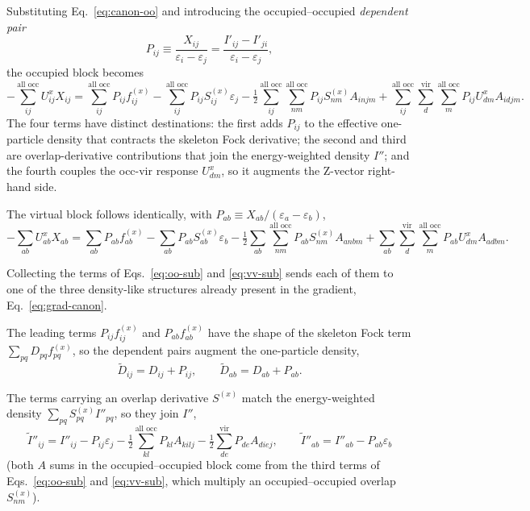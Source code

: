 \documentclass[12pt]{article}
\newcommand{\vir}{\text{vir}}
\newcommand{\alloc}{\text{all occ}}   %
\begin{document}
\noindent
Substituting Eq.~\eqref{eq:canon-oo} and introducing the occupied--occupied
{\em dependent pair}
\begin{equation}
P_{ij} \equiv \frac{X_{ij}}{\varepsilon_i-\varepsilon_j}
= \frac{I'_{ij}-I'_{ji}}{\varepsilon_i-\varepsilon_j},
\label{eq:Poo}
\end{equation}
the occupied block becomes
\begin{equation}
-\sum_{ij}^{\alloc}U^x_{ij}X_{ij}
= \sum_{ij}^{\alloc}P_{ij}f^{(x)}_{ij}
- \sum_{ij}^{\alloc}P_{ij}S^{(x)}_{ij}\varepsilon_j
- \tfrac12\sum_{ij}^{\alloc}\sum_{nm}^{\alloc}P_{ij}S^{(x)}_{nm}A_{injm}
+ \sum_{ij}^{\alloc}\sum_{d}^{\vir}\sum_{m}^{\alloc}P_{ij}U^x_{dm}A_{idjm}.
\label{eq:oo-sub}
\end{equation}
The four terms have distinct
destinations: the first adds $P_{ij}$ to the effective
one-particle density that contracts the skeleton Fock derivative; the second and
third are overlap-derivative contributions that join the energy-weighted density
$I''$; and the fourth couples the occ-vir response $U^x_{dm}$, so it augments the
Z-vector right-hand side.

\noindent
The virtual block follows identically, with
$P_{ab}\equiv X_{ab}/(\varepsilon_a-\varepsilon_b)$,
\begin{equation}
-\sum_{ab}U^x_{ab}X_{ab}
= \sum_{ab}P_{ab}f^{(x)}_{ab}
- \sum_{ab}P_{ab}S^{(x)}_{ab}\varepsilon_b
- \tfrac12\sum_{ab}\sum_{nm}^{\alloc}P_{ab}S^{(x)}_{nm}A_{anbm}
+ \sum_{ab}\sum_{d}^{\vir}\sum_{m}^{\alloc}P_{ab}U^x_{dm}A_{adbm}.
\label{eq:vv-sub}
\end{equation}

Collecting the terms of Eqs.~\eqref{eq:oo-sub} and \eqref{eq:vv-sub} sends each
of them to one of the three density-like structures already present in the
gradient, Eq.~\eqref{eq:grad-canon}.

The leading terms $P_{ij}f^{(x)}_{ij}$ and $P_{ab}f^{(x)}_{ab}$ have the shape
of the skeleton Fock term $\sum_{pq}D_{pq}f^{(x)}_{pq}$, so the dependent pairs
augment the one-particle density,
\begin{equation}
\tilde{D}_{ij} = D_{ij} + P_{ij}, \qquad \tilde{D}_{ab} = D_{ab} + P_{ab}.
\label{eq:Dtilde}
\end{equation}

The terms carrying an overlap derivative $S^{(x)}$ match the energy-weighted
density $\sum_{pq}S^{(x)}_{pq}I''_{pq}$, so they join $I''$,
\begin{equation}
\tilde{I}''_{ij} = I''_{ij} - P_{ij}\varepsilon_j
- \tfrac12\sum_{kl}^{\alloc}P_{kl}A_{kilj}
- \tfrac12\sum_{de}^{\vir}P_{de}A_{diej},
\qquad
\tilde{I}''_{ab} = I''_{ab} - P_{ab}\varepsilon_b
\label{eq:Idouble-tilde}
\end{equation}
(both $A$ sums in the occupied--occupied block come from the third terms of
Eqs.~\eqref{eq:oo-sub} and \eqref{eq:vv-sub}, which multiply an
occupied--occupied overlap $S^{(x)}_{nm}$).
\end{document}
